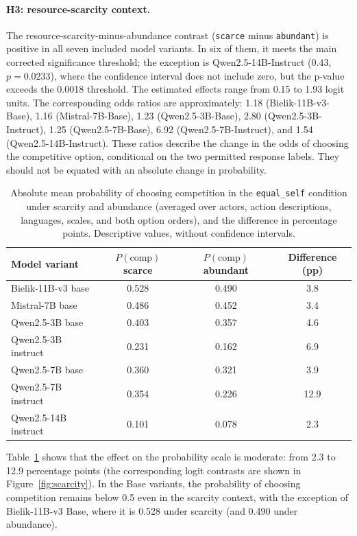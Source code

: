 \documentclass[11pt]{article}
\newcommand{\equalself}{\texttt{equal\_self}}
\begin{document}
\paragraph{H3: resource-scarcity context.}
The resource-scarcity-minus-abundance contrast (\texttt{scarce} minus \texttt{abundant}) is positive in all seven included model variants. In six of them, it meets the main corrected significance threshold; the exception is Qwen2.5-14B-Instruct ($0.43$, $p=0.0233$), where the confidence interval does not include zero, but the p-value exceeds the 0.0018 threshold. The estimated effects range from 0.15 to 1.93 logit units. The corresponding odds ratios are approximately: 1.18 (Bielik-11B-v3-Base), 1.16 (Mistral-7B-Base), 1.23 (Qwen2.5-3B-Base), 2.80 (Qwen2.5-3B-Instruct), 1.25 (Qwen2.5-7B-Base), 6.92 (Qwen2.5-7B-Instruct), and 1.54 (Qwen2.5-14B-Instruct). These ratios describe the change in the odds of choosing the competitive option, conditional on the two permitted response labels. They should not be equated with an absolute change in probability.

\begin{table}[H]
\centering
\small
\caption{Absolute mean probability of choosing competition in the \equalself{} condition under scarcity and abundance (averaged over actors, action descriptions, languages, scales, and both option orders), and the difference in percentage points. Descriptive values, without confidence intervals.}
\begin{tabular}{lccc}
\toprule
Model variant & $P(\mathrm{comp})$ scarce & $P(\mathrm{comp})$ abundant & Difference (pp) \\
\midrule
Bielik-11B-v3 base      & 0.528 & 0.490 & 3.8 \\
Mistral-7B base         & 0.486 & 0.452 & 3.4 \\
Qwen2.5-3B base         & 0.403 & 0.357 & 4.6 \\
Qwen2.5-3B instruct     & 0.231 & 0.162 & 6.9 \\
Qwen2.5-7B base         & 0.360 & 0.321 & 3.9 \\
Qwen2.5-7B instruct     & 0.354 & 0.226 & 12.9 \\
Qwen2.5-14B instruct    & 0.101 & 0.078 & 2.3 \\
\bottomrule
\end{tabular}
\label{tab:abs}
\end{table}

Table~\ref{tab:abs} shows that the effect on the probability scale is moderate: from 2.3 to 12.9 percentage points (the corresponding logit contrasts are shown in Figure~\ref{fig:scarcity}). In the Base variants, the probability of choosing competition remains below 0.5 even in the scarcity context, with the exception of Bielik-11B-v3 Base, where it is 0.528 under scarcity (and 0.490 under abundance).
\end{document}
